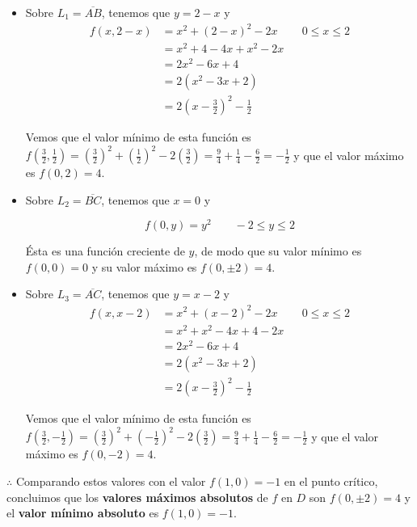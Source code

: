 \documentclass[12pt]{article}
\begin{document}
\begin{itemize}

\item Sobre $L_1=\overline{AB}$, tenemos que $y=2-x$ y
\begin{align*}
  f(x,2-x)
  &=x^2+(2-x)^2-2x && 0 \leq x \leq 2 \\
  &=x^2 + 4 -4x + x^2 -2x \\
  &= 2x^2-6x+4 \\
  &= 2(x^2-3x+2) \\
  &= 2\left(x-\frac{3}{2}\right)^2 - \frac{1}{2}
\end{align*}

Vemos que el valor mínimo de esta función es $f\left(\frac{3}{2}, \frac{1}{2} \right) =  \left(\frac{3}{2}\right)^2 + \left(\frac{1}{2}\right)^2 - 2\left(\frac{3}{2}\right) = \frac{9}{4}+\frac{1}{4}-\frac{6}{2}=-\frac{1}{2}$ y que el valor máximo es $f(0,2)=4$. \\

\item Sobre $L_2=\overline{BC}$, tenemos que $x=0$ y

$$f(0,y)=y^2 \qquad -2 \leq y \leq 2$$

Ésta es una función creciente de $y$, de modo que su valor mínimo es $f(0,0)=0$ y su
valor máximo es $f(0,\pm 2)=4$. \\

\item Sobre $L_3=\overline{AC}$, tenemos que $y=x-2$ y
\begin{align*}
  f(x,x-2)
  &= x^2+(x-2)^2-2x && 0 \leq x \leq 2 \\
  &= x^2+x^2 -4x + 4 -2x \\
  &= 2x^2-6x+4\\
  &= 2(x^2-3x+2) \\
  &= 2\left(x-\frac{3}{2}\right)^2 - \frac{1}{2}
\end{align*}

Vemos que el valor mínimo de esta función es $f\left(\frac{3}{2}, -\frac{1}{2} \right) =  \left(\frac{3}{2}\right)^2 + \left(-\frac{1}{2}\right)^2 - 2\left(\frac{3}{2}\right) = \frac{9}{4}+\frac{1}{4}-\frac{6}{2}=-\frac{1}{2}$ y que el valor máximo es $f(0,-2)=4$. \\

\end{itemize}

$\therefore $ Comparando estos valores con el valor $f(1,0) = -1$ en el punto crítico, concluimos que los \textbf{valores máximos absolutos} de $f$ en $D$ son $f(0,\pm 2)=4$ y el \textbf{valor mínimo absoluto} es $f(1,0)=-1$.
\end{document}
